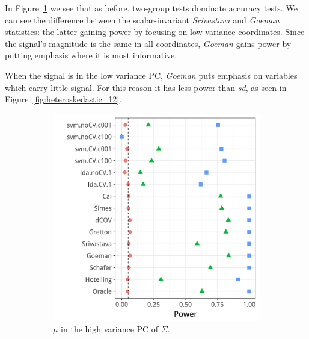 \documentclass[journal]{IEEEtran}
\begin{document}
In Figure~\ref{fig:heteroskedastic_11} we see that as before, two-group tests dominate accuracy tests.
We can see the difference between the scalar-invariant \emph{Srivastava} and \emph{Goeman} statistics: the latter gaining power by focusing on low variance coordinates. 
Since the signal's magnitude is the same in all coordinates, \emph{Goeman} gains power by putting emphasis where it is most informative.

When the signal is in the low variance PC, \emph{Goeman} puts emphasis on variables which carry little signal.
For this reason it has less power than \emph{sd}, as seen in Figure~\ref{fig:heteroskedastic_12}.

\begin{figure}[h]
	\centering
	\caption{Heteroskedasticity: $\Sigma$ is diagonal with $\Sigma_{jj}=j$.}	
	\label{fig:heteroskedastic}	
	\begin{subfigure}[t]{.45\columnwidth}
		\centering
		\includegraphics[width=1\columnwidth]{"art/file26"}
		\caption{$\mu$ in the high variance PC of $\Sigma$.}  
		\label{fig:heteroskedastic_11}	
	\end{subfigure}
	\begin{subfigure}[t]{0.45\columnwidth}
		\centering

\end{subfigure}
\end{figure}
\end{document}
